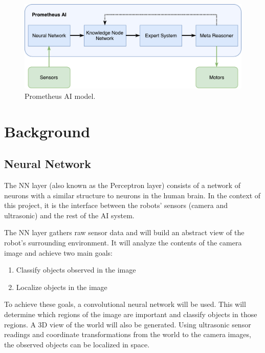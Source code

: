 \documentclass[titlepage,11pt]{article}
\begin{document}
\begin{figure}[!htb]
	\includegraphics[width=\columnwidth]{figures/ai_model.pdf}
	\caption{Prometheus AI model.}
	\label{model}
\end{figure}

\section{Background}
\label{sec:background}

\subsection{Neural Network}

The NN layer (also known as the Perceptron layer) consists of a network of neurons with a similar structure to neurons in the human brain. In the context of this project, it is the interface between the robots' sensors (camera and ultrasonic) and the rest of the AI system.

The NN layer gathers raw sensor data and will build an abstract view of the robot's surrounding environment. It will analyze the contents of the camera image and achieve two main goals:

\begin{enumerate}
	\item Classify objects observed in the image
	\item Localize objects in the image
\end{enumerate}

To achieve these goals, a convolutional neural network will be used. This will determine which regions of the image are important and classify objects in those regions. A 3D view of the world will also be generated. Using ultrasonic sensor readings and coordinate transformations from the world to the camera images, the observed objects can be localized in space.
\end{document}
